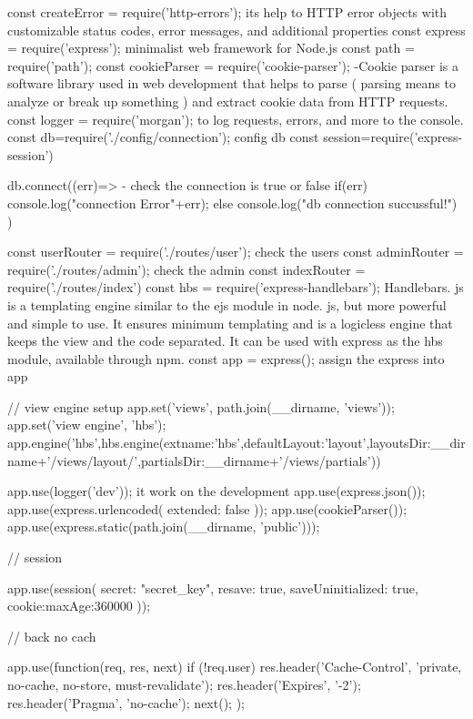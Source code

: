 const createError = require('http-errors');  its help to HTTP error objects with customizable status codes, error messages, and additional properties
const express = require('express');  minimalist web framework for Node.js
const path = require('path'); 
const cookieParser = require('cookie-parser'); -Cookie parser is a software library used in web development that helps to parse ( parsing means to analyze or break up something ) and extract cookie data from HTTP requests.
const logger = require('morgan');  to log requests, errors, and more to the console.
const db=require('./config/connection'); config db
const session=require('express-session') 

db.connect((err)=>{ - check the connection is true or false
  if(err) console.log("connection Error"+err);
  else console.log("db connection succussful!")
})


const userRouter = require('./routes/user'); check the users 
const adminRouter = require('./routes/admin'); check the admin
const indexRouter = require('./routes/index') 
const hbs = require('express-handlebars');   Handlebars. js is a templating engine similar to the ejs module in node. js, but more powerful and simple to use. It ensures minimum templating and is a logicless engine that keeps the view and the code separated. It can be used with express as the hbs module, available through npm.
const app = express(); assign the express into app



// view engine setup
app.set('views', path.join(__dirname, 'views'));
app.set('view engine', 'hbs');
app.engine('hbs',hbs.engine({extname:'hbs',defaultLayout:'layout',layoutsDir:__dirname+'/views/layout/',partialsDir:__dirname+'/views/partials'}))

app.use(logger('dev'));  it work on the development
app.use(express.json()); 
app.use(express.urlencoded({ extended: false }));
app.use(cookieParser());
app.use(express.static(path.join(__dirname, 'public')));

   
// session

app.use(session({
  secret: "secret_key",
  resave: true, 
  saveUninitialized: true,
  cookie:{maxAge:360000}
}));

// back no cach  

app.use(function(req, res, next) {
  if (!req.user) {
      res.header('Cache-Control', 'private, no-cache, no-store, must-revalidate');
      res.header('Expires', '-2');
      res.header('Pragma', 'no-cache');
  }
  next();
});

